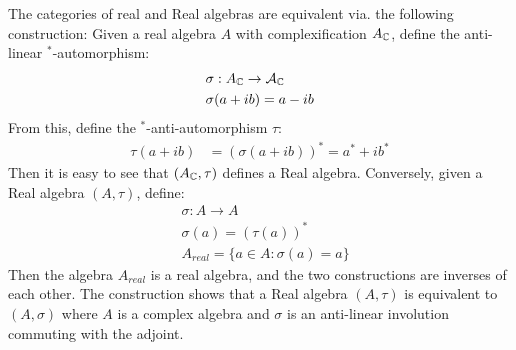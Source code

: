 \begin{remark}\label{equivalent}
	The categories of real and Real \Cstar algebras are equivalent via. the following construction:
	Given a real \Cstar algebra $A$ with complexification $A_{\mathbb{C}}$, define the anti-linear $^*$-automorphism: 
	\begin{align*}
		&\sigma:A_{\mathbb{C}}\to \mathcal{A}_{\mathbb{C}} \\
		&\sigma(a+ib)=a-ib
	\end{align*}
	From this, define the $^*$-anti-automorphism $\tau$:
	\begin{align*}
		\tau(a+ib)&=(\sigma(a+ib))^*=a^*+ib^*
	\end{align*}
	Then it is easy to see that $(A_{\mathbb{C}},\tau)$ defines a Real \Cstar algebra.
	Conversely, given a Real \Cstar algebra $(A,\tau)$, define: 
	\begin{align*}
		&\sigma:A\to A \\
		&\sigma(a)=(\tau(a))^* \\
		&A_{real}=\{a\in A: \sigma(a)=a\}
	\end{align*}
	Then the algebra $A_{real}$ is a real \Cstar algebra, and the two constructions are inverses of each other. 
	The construction shows that a Real \Cstar algebra $(A,\tau)$ is equivalent to $(A,\sigma)$ where $A$ is a complex \Cstar algebra and $\sigma$ is an anti-linear involution commuting with the adjoint. 
\end{remark}

